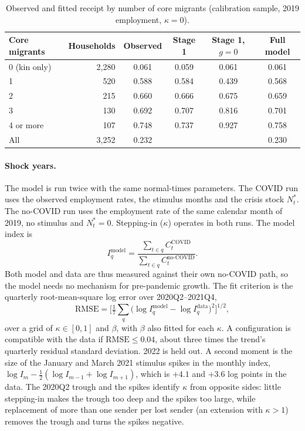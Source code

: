 \begin{table}[ht]
\centering
\caption{Observed and fitted receipt by number of core migrants (calibration sample, 2019 employment, $\kappa = 0$).}
\label{tab:dm-fit}
\begin{tabular}{lrcccc}
\toprule
Core migrants & Households & Observed & Stage 1 & Stage 1, $g = 0$ & Full model \\
\midrule
0 (kin only) & 2,280 & 0.061 & 0.059 & 0.061 & 0.061 \\
1 & 520 & 0.588 & 0.584 & 0.439 & 0.568 \\
2 & 215 & 0.660 & 0.666 & 0.675 & 0.659 \\
3 & 130 & 0.692 & 0.707 & 0.816 & 0.701 \\
4 or more & 107 & 0.748 & 0.737 & 0.927 & 0.758 \\
\midrule
All & 3,252 & 0.232 & & & 0.230 \\
\bottomrule
\end{tabular}
\end{table}

\paragraph{Shock years.} The model is run twice with the same normal-times parameters. The COVID run uses the observed employment rates, the stimulus months and the crisis stock $N^*_t$. The no-COVID run uses the employment rate of the same calendar month of 2019, no stimulus and $N^*_t = 0$. Stepping-in ($\kappa$) operates in both runs. The model index is
\begin{equation}
I^{\mathrm{model}}_q = \frac{\sum_{t \in q} C^{\mathrm{COVID}}_t}{\sum_{t \in q} C^{\mathrm{no\text{-}COVID}}_t}.
\end{equation}
Both model and data are thus measured against their own no-COVID path, so the model needs no mechanism for pre-pandemic growth. The fit criterion is the quarterly root-mean-square log error over 2020Q2--2021Q4,
\begin{equation}
\mathrm{RMSE} = \Big[\tfrac{1}{7}\textstyle\sum_{q} \big(\log I^{\mathrm{model}}_q - \log I^{\mathrm{data}}_q\big)^2\Big]^{1/2},
\end{equation}
over a grid of $\kappa \in [0, 1]$ and $\beta$, with $\beta$ also fitted for each $\kappa$. A configuration is compatible with the data if $\mathrm{RMSE} \le 0.04$, about three times the trend's quarterly residual standard deviation. 2022 is held out. A second moment is the size of the January and March 2021 stimulus spikes in the monthly index, $\log I_m - \tfrac12(\log I_{m-1} + \log I_{m+1})$, which is $+4.1$ and $+3.6$ log points in the data. The 2020Q2 trough and the spikes identify $\kappa$ from opposite sides: little stepping-in makes the trough too deep and the spikes too large, while replacement of more than one sender per lost sender (an extension with $\kappa > 1$) removes the trough and turns the spikes negative.

